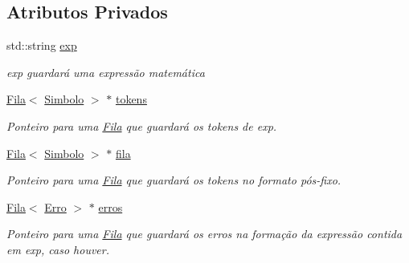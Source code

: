 \subsection*{Atributos Privados}
\begin{DoxyCompactItemize}
\item 
\hypertarget{class_expressao_a2a9e296041b11983d15c8cd52849cd9b}{std\-::string \hyperlink{class_expressao_a2a9e296041b11983d15c8cd52849cd9b}{exp}}\label{class_expressao_a2a9e296041b11983d15c8cd52849cd9b}

\begin{DoxyCompactList}\small\item\em exp guardará uma expressão matemática \end{DoxyCompactList}\item 
\hypertarget{class_expressao_ae8528431a58ed3a8029737fdb3b732a4}{\hyperlink{class_fila}{Fila}$<$ \hyperlink{class_simbolo}{Simbolo} $>$ $\ast$ \hyperlink{class_expressao_ae8528431a58ed3a8029737fdb3b732a4}{tokens}}\label{class_expressao_ae8528431a58ed3a8029737fdb3b732a4}

\begin{DoxyCompactList}\small\item\em Ponteiro para uma \hyperlink{class_fila}{Fila} que guardará os tokens de exp. \end{DoxyCompactList}\item 
\hypertarget{class_expressao_afaf2de2113c7af473bef78456fcfe330}{\hyperlink{class_fila}{Fila}$<$ \hyperlink{class_simbolo}{Simbolo} $>$ $\ast$ \hyperlink{class_expressao_afaf2de2113c7af473bef78456fcfe330}{fila}}\label{class_expressao_afaf2de2113c7af473bef78456fcfe330}

\begin{DoxyCompactList}\small\item\em Ponteiro para uma \hyperlink{class_fila}{Fila} que guardará os tokens no formato pós-\/fixo. \end{DoxyCompactList}\item 
\hypertarget{class_expressao_a0bb6edb491bbe0a21b25057839e3daa0}{\hyperlink{class_fila}{Fila}$<$ \hyperlink{class_erro}{Erro} $>$ $\ast$ \hyperlink{class_expressao_a0bb6edb491bbe0a21b25057839e3daa0}{erros}}\label{class_expressao_a0bb6edb491bbe0a21b25057839e3daa0}

\begin{DoxyCompactList}\small\item\em Ponteiro para uma \hyperlink{class_fila}{Fila} que guardará os erros na formação da expressão contida em exp, caso houver. \end{DoxyCompactList}\end{DoxyCompactItemize}


